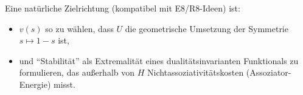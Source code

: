 \documentclass[11pt,a4paper]{article}
\theoremstyle{definition}
\theoremstyle{remark}
\begin{document}
	Eine natürliche Zielrichtung (kompatibel mit E8/R8-Ideen) ist:
	\begin{itemize}
		\item $v(s)$ so zu wählen, dass $U$ die geometrische Umsetzung der Symmetrie
		$s\mapsto 1-s$ ist,
		\item und ``Stabilität'' als Extremalität eines dualitätsinvarianten Funktionals
		zu formulieren, das außerhalb von $H$ Nichtassoziativitätskosten (Assoziator-Energie)
		misst.
	\end{itemize}
	
\end{document}
